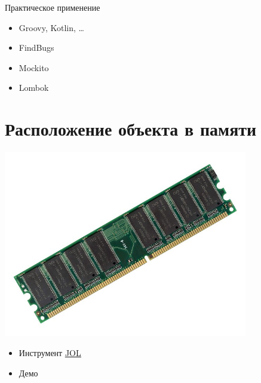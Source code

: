 \documentclass[unicode]{beamer}
\begin{document}
\begin{frame}{Практическое применение}
\begin{itemize}
\item Groovy, Kotlin, \ldots
    \bigskip
\item FindBugs
    \bigskip
\item Mockito
    \bigskip
\item Lombok
\end{itemize}
\end{frame}


\section{Расположение объекта в памяти}

\begin{frame}
\centering
\includegraphics[width=0.8\textwidth]{pics/memory.jpg}
\end{frame}


\begin{frame}
\begin{itemize}
\item Инструмент \underline{\href{http://openjdk.java.net/projects/code-tools/jol/}{JOL}}
    \bigskip

\item Демо
\end{itemize}
\end{frame}
\end{document}
